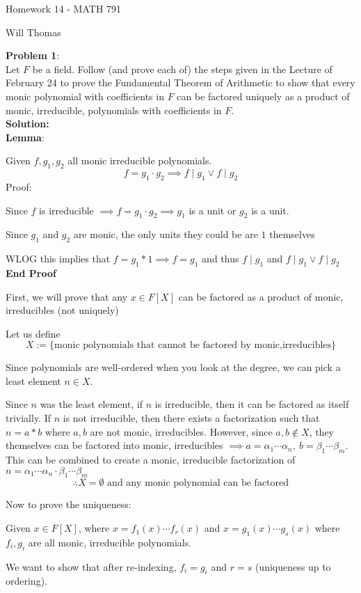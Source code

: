 \documentclass[11pt]{article}
\newcommand{\prob}[3]{\begin{flushleft}
        \textbf{Problem #1}: \\
        #2 
		\textbf{Solution:} 
		#3

\end{flushleft}}
\newcommand{\makeHWtitle}[1]{
    \begin{center}
    \Large{Homework #1 - MATH 791} 
        \vspace{5pt}
        
        \normalsize{Will Thomas}
        \vspace{5pt}
    \end{center}
}
\begin{document}
\makeHWtitle{14}

\prob{1}{
    Let $F$ be a field. Follow (and prove each of) the steps given in the Lecture of February 24 to
    prove the Fundamental Theorem of Arithmetic to show that every monic polynomial with coefficients in
    $F$ can be factored uniquely as a product of monic, irreducible, polynomials with coefficients in $F$. \\
}{\\
    \textbf{Lemma}:

    Given $f, g_1, g_2$ all monic irreducible polynomials.
    $$f = g_1 \cdot g_2 \implies f \mid g_1 \lor f \mid g_2$$
    Proof:

    Since $f$ is irreducible $\implies f = g_1 \cdot g_2 \implies g_1$ is a unit or $g_2$ is a unit.

    Since $g_1$ and $g_2$ are monic, the only units they could be are $1$ themselves

    WLOG this implies that $f = g_1 * 1 \implies f = g_1$ and thus $f \mid g_1$ and $f\mid g_1 \lor f \mid g_2$ \\
    \textbf{End Proof}


    First, we will prove that any $x \in F[X]$ can be factored as a product of monic, irreducibles (not uniquely)

    Let us define
    $$X := \{ \text{monic polynomials that cannot be factored by monic,irreducibles} \}$$

    Since polynomials are well-ordered when you look at the degree, we can pick a least element $n \in X$.

    Since $n$ was the least element, if $n$ is irreducible, then it can be factored as itself trivially. If $n$ is not irreducible, then there exists a factorization such that $n = a * b$ where $a,b$ are not monic, irreducibles. However, since $a,b \notin X$, they themselves can be factored into monic, irreducibles $\implies a = \alpha_1 \cdots \alpha_n, \ b = \beta_1 \cdots \beta_m$. This can be combined to create a monic, irreducible factorization of $n = \alpha_1 \cdots \alpha_n \cdot \beta_1 \cdots \beta_m$
    $$\therefore \text{$X = \emptyset$ and any monic polynomial can be factored}$$

    Now to prove the uniqueness:

    Given $x \in F[X]$, where $x = f_1(x) \cdots f_r(x)$ and $x = g_1(x) \cdots g_s(x)$ where $f_i, g_i$ are all monic, irreducible polynomials.

    We want to show that after re-indexing, $f_i = g_i$ and $r = s$ (uniqueness up to ordering).

}
\end{document}
